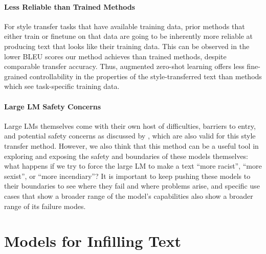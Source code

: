 \paragraph{Less Reliable than Trained Methods}
For style transfer tasks that have available training data, prior methods that either train or finetune on that data are going to be inherently more reliable at producing text that looks like their training data.
This can be observed in the lower BLEU scores our method achieves than trained methods, despite comparable transfer accuracy.
Thus, augmented zero-shot learning offers less fine-grained controllability in the properties of the style-transferred text than methods which see task-specific training data.

\paragraph{Large LM Safety Concerns} Large LMs themselves come with their own host of difficulties, barriers to entry, and potential safety concerns as discussed by \citet{bender2021stochastic}, which are also valid for this style transfer method. However, we also think that this method can be a useful tool in exploring and exposing the safety and boundaries of these models themselves: what happens if we try to force the large LM to make a text ``more racist'', ``more sexist'', or ``more incendiary''? It is important to keep pushing these models to their boundaries to see where they fail and where problems arise, and specific use cases that show a broader range of the model's capabilities also show a broader range of its failure modes.



\section{Models for Infilling Text}
\label{section:fitb}


